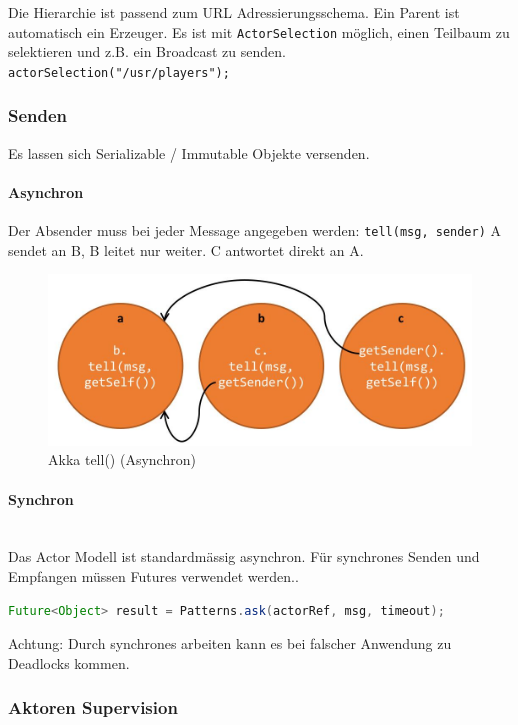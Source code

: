 Die Hierarchie ist passend zum URL Adressierungsschema. Ein Parent ist automatisch ein Erzeuger. Es ist mit \lstinline|ActorSelection| möglich, einen Teilbaum zu selektieren und z.B. ein Broadcast zu senden. \lstinline|actorSelection("/usr/players");|

\subsubsection{Senden}

Es lassen sich Serializable / Immutable Objekte versenden.

\paragraph{Asynchron}
Der Absender muss bei jeder Message angegeben werden: \lstinline|tell(msg, sender)| A sendet an B, B leitet nur weiter. C antwortet direkt an A.

\begin{figure}[h]
	\centering
	\includegraphics[width=0.7\linewidth]{img/akka_tell_asynchron}
	\caption{Akka tell() (Asynchron)}
	\label{fig:akkatellasynchron}
\end{figure}


\paragraph{Synchron} \hfill \\
Das Actor Modell ist standardmässig asynchron. Für synchrones Senden und Empfangen müssen Futures verwendet werden..
\begin{lstlisting}[language=java]
Future<Object> result = Patterns.ask(actorRef, msg, timeout);
\end{lstlisting}

Achtung: Durch synchrones arbeiten kann es bei falscher Anwendung zu Deadlocks kommen.

\subsubsection{Aktoren Supervision}

